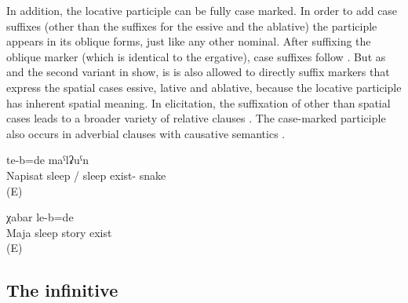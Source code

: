 In addition, the locative participle can be fully case marked. In order to add case suffixes (other than the suffixes for the essive and the ablative) the participle appears in its oblique forms, just like any other nominal. After suffixing the oblique marker  (which is identical to the ergative), case suffixes follow . But as  and the second variant in  show, is is also allowed to directly suffix markers that express the spatial cases essive, lative and ablative, because the locative participle has inherent spatial meaning. In elicitation, the suffixation of other than spatial cases leads to a broader variety of relative clauses . The case-marked participle also occurs in adverbial clauses with causative semantics .
%
\begin{exe}
	\ex	\label{ex:‎‎‎Where Napisat was sleeping there was a snake}
		te-b=de	maˁlʡuˁn\\
		Napisat	sleep	/ sleep	exist-	snake\\
	\glt	{} (E)

	\ex	\label{ex:‎ ‎‎There was the gossip that Maja was lying}
		χabar	le-b=de\\
		Maja	sleep	story	exist\\
	\glt	{} (E)
\end{exe}



\subsection{The infinitive}
\label{ssec:The infinitive}

